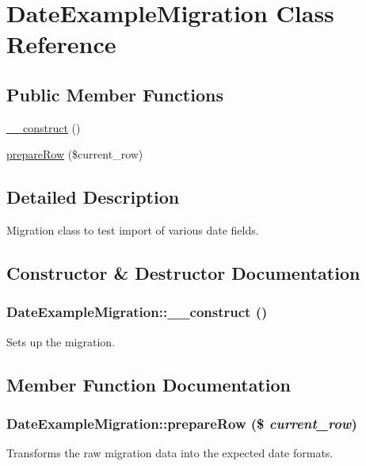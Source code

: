 \hypertarget{classDateExampleMigration}{
\section{DateExampleMigration Class Reference}
\label{classDateExampleMigration}
}
\subsection*{Public Member Functions}
\begin{DoxyCompactItemize}
\item 
\hyperlink{classDateExampleMigration_a5550f3edc626a1fb77f8a1de176a232e}{\_\-\_\-construct} ()
\item 
\hyperlink{classDateExampleMigration_ad42f7cc6f037385ef7b6d148652eaffa}{prepareRow} (\$current\_\-row)
\end{DoxyCompactItemize}


\subsection{Detailed Description}
Migration class to test import of various date fields. 

\subsection{Constructor \& Destructor Documentation}
\hypertarget{classDateExampleMigration_a5550f3edc626a1fb77f8a1de176a232e}{
\subsubsection[{\_\-\_\-construct}]{\setlength{\rightskip}{0pt plus 5cm}DateExampleMigration::\_\-\_\-construct ()}}
\label{classDateExampleMigration_a5550f3edc626a1fb77f8a1de176a232e}
Sets up the migration. 

\subsection{Member Function Documentation}
\hypertarget{classDateExampleMigration_ad42f7cc6f037385ef7b6d148652eaffa}{
\subsubsection[{prepareRow}]{\setlength{\rightskip}{0pt plus 5cm}DateExampleMigration::prepareRow (\$ {\em current\_\-row})}}
\label{classDateExampleMigration_ad42f7cc6f037385ef7b6d148652eaffa}
Transforms the raw migration data into the expected date formats.

